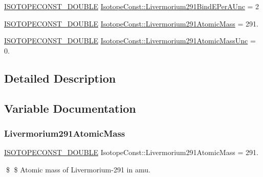 \begin{DoxyCompactItemize}
\item 
\mbox{\hyperlink{group___isotope_const-_macros_ga8f45a7272ce02c0b4c65c44636ed719a}{I\+S\+O\+T\+O\+P\+E\+C\+O\+N\+S\+T\+\_\+\+D\+O\+U\+B\+LE}} \mbox{\hyperlink{group___isotope_const-_livermorium-_lv291_gad84f19010135cdbdcab4dd811708bbb5}{Isotope\+Const\+::\+Livermorium291\+Bind\+E\+Per\+A\+Unc}} = 2
\item 
\mbox{\hyperlink{group___isotope_const-_macros_ga8f45a7272ce02c0b4c65c44636ed719a}{I\+S\+O\+T\+O\+P\+E\+C\+O\+N\+S\+T\+\_\+\+D\+O\+U\+B\+LE}} \mbox{\hyperlink{group___isotope_const-_livermorium-_lv291_gafe8ffb5cd1542c717516ac149fcb1bca}{Isotope\+Const\+::\+Livermorium291\+Atomic\+Mass}} = 291.
\item 
\mbox{\hyperlink{group___isotope_const-_macros_ga8f45a7272ce02c0b4c65c44636ed719a}{I\+S\+O\+T\+O\+P\+E\+C\+O\+N\+S\+T\+\_\+\+D\+O\+U\+B\+LE}} \mbox{\hyperlink{group___isotope_const-_livermorium-_lv291_gab53639374893bd6ece6f82a91c7ffd48}{Isotope\+Const\+::\+Livermorium291\+Atomic\+Mass\+Unc}} = 0.
\end{DoxyCompactItemize}


\subsection{Detailed Description}


\subsection{Variable Documentation}
\mbox{\label{group___isotope_const-_livermorium-_lv291_gafe8ffb5cd1542c717516ac149fcb1bca}} 
\subsubsection{\texorpdfstring{Livermorium291\+Atomic\+Mass}{Livermorium291AtomicMass}}
{\footnotesize\ttfamily \mbox{\hyperlink{group___isotope_const-_macros_ga8f45a7272ce02c0b4c65c44636ed719a}{I\+S\+O\+T\+O\+P\+E\+C\+O\+N\+S\+T\+\_\+\+D\+O\+U\+B\+LE}} Isotope\+Const\+::\+Livermorium291\+Atomic\+Mass = 291.}

\$ \$ Atomic mass of Livermorium-\/291 in amu. \mbox{\label{group___isotope_const-_livermorium-_lv291_gab53639374893bd6ece6f82a91c7ffd48}} 
